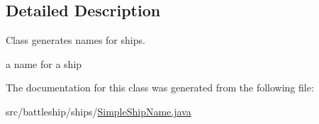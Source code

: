 \subsection{Detailed Description}
Class generates names for ships. 

a name for a ship 

The documentation for this class was generated from the following file\+:\begin{DoxyCompactItemize}
\item 
src/battleship/ships/\hyperlink{SimpleShipName_8java}{Simple\+Ship\+Name.\+java}\end{DoxyCompactItemize}
